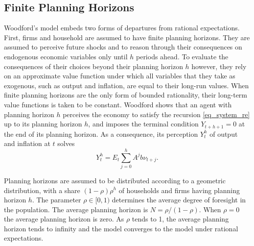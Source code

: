 \documentclass{article}
\begin{document}
\subsection{Finite Planning Horizons}
Woodford's model embeds two forms of departures from rational expectations. First, firms and household are assumed to have finite planning horizons. They are assumed to perceive future shocks and to reason through their consequences on endogenous economic variables only until $h$ periods ahead. To evaluate the consequences of their choices beyond their planning horizon $h$ however, they rely on an approximate value function under which all variables that they take as exogenous, such as output and inflation, are equal to their long-run values. When finite planning horizons are the only form of bounded rationality, their long-term value functions is taken to be constant. Woodford shows that an agent with planning horizon $h$ perceives the economy to satisfy the recursion \eqref{eq_system_re} up to its planning horizon $h$, and imposes the terminal condition $Y_{t+h+1}=0$ at the end of its planning horizon. As a consequence, its perception $Y_t^h$ of output and inflation at $t$ solves
\begin{equation}
Y_t^h =  E_t \sum_{j=0}^h A^j b \nu_{t+j}.\label{eq_fph_indiv}
\end{equation}

Planning horizons are assumed to be distributed according to a geometric distribution, with a share $(1-\rho)\rho^h$ of households and firms having planning horizon $h$. The parameter $\rho \in [0,1)$ determines the average degree of foresight in the population. The average planning horizon is $N=\rho/(1-\rho)$. When $\rho=0$ the average planning horizon is zero. As $\rho$ tends to 1, the average planning horizon tends to infinity and the model converges to the model under rational expectations.
\end{document}
